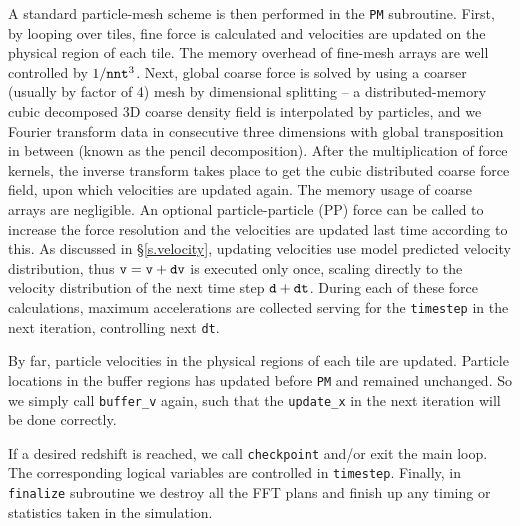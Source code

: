 \documentclass[10pt,twocolumn,preprint]{emulateapj}
\begin{document}
A standard particle-mesh scheme is then performed in the {\tt PM} subroutine. First, by looping over tiles, fine force is calculated and velocities are updated on the physical region of each tile. The memory overhead of fine-mesh arrays are well controlled by $1/{\tt nnt}^3$. Next, global coarse force is solved by using a coarser (usually by factor of 4) mesh by dimensional splitting -- a distributed-memory cubic decomposed 3D coarse density field is interpolated by particles, and we Fourier transform data in consecutive three dimensions with global transposition in between (known as the pencil decomposition). After the multiplication of force kernels, the inverse transform takes place to get the cubic distributed coarse force field, upon which velocities are updated again. The memory usage of coarse arrays are negligible. An optional particle-particle (PP) force can be called to increase the force resolution and the velocities are updated last time according to this. As discussed in \S\ref{s.velocity}, updating velocities use model predicted velocity distribution, thus ${\tt v}={\tt v}+{\tt dv}$ is executed only once, scaling directly to the velocity distribution of the next time step ${\tt d}+{\tt dt}$. During each of these force calculations, maximum accelerations are collected serving for the {\tt timestep} in the next iteration, controlling next {\tt dt}.

By far, particle velocities in the physical regions of each tile are updated. Particle locations in the buffer regions has updated before {\tt PM} and remained unchanged. So we simply call {\tt buffer\_v} again, such that the {\tt update\_x} in the next iteration will be done correctly.

If a desired redshift is reached, we call {\tt checkpoint} and/or exit the main loop. The corresponding logical variables are controlled in {\tt timestep}. Finally, in {\tt finalize} subroutine we destroy all the FFT plans and finish up any timing or statistics taken in the simulation.
\end{document}
